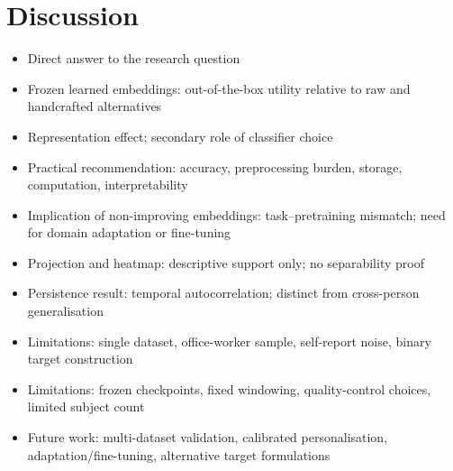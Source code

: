 \section{Discussion}

\begin{itemize}
  \item Direct answer to the research question
  \item Frozen learned embeddings: out-of-the-box utility relative to raw and handcrafted alternatives
  \item Representation effect; secondary role of classifier choice
  \item Practical recommendation: accuracy, preprocessing burden, storage, computation, interpretability
  \item Implication of non-improving embeddings: task--pretraining mismatch; need for domain adaptation or fine-tuning
  \item Projection and heatmap: descriptive support only; no separability proof
  \item Persistence result: temporal autocorrelation; distinct from cross-person generalisation
  \item Limitations: single dataset, office-worker sample, self-report noise, binary target construction
  \item Limitations: frozen checkpoints, fixed windowing, quality-control choices, limited subject count
  \item Future work: multi-dataset validation, calibrated personalisation, adaptation/fine-tuning, alternative target formulations
\end{itemize}
